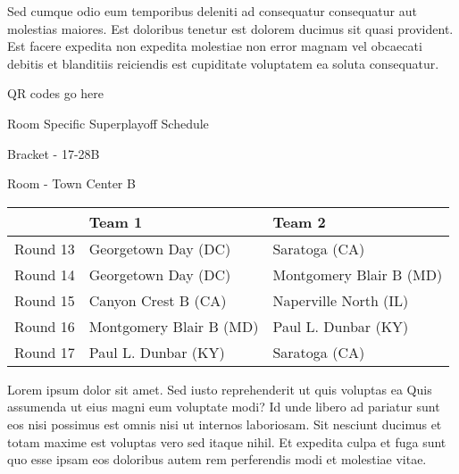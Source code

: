 \documentclass{article}%
\begin{document}
\newline%
Sed cumque odio eum temporibus deleniti ad consequatur consequatur aut molestias maiores. Est doloribus tenetur est dolorem ducimus sit quasi provident. Est facere expedita non expedita molestiae non error magnam vel obcaecati debitis et blanditiis reiciendis est cupiditate voluptatem ea soluta consequatur.%
\vspace*{140pt}%
\begin{center}%
\begin{Huge}%
QR codes go here%
\end{Huge}%
\end{center}%
\newpage%
\begin{center}%
\begin{Huge}%
Room Specific Superplayoff Schedule%
\end{Huge}%
\vspace*{8pt}%
\linebreak%
\begin{Large}%
Bracket {-} 17{-}28B%
\end{Large}%
\vspace*{8pt}%
\linebreak%
\vspace*{8pt}%
\begin{Large}%
Room {-} Town Center B%
\end{Large}%
\end{center}%
%
\begin{tabularx}{\textwidth}{|c|Y|Y|}%
\hline%
&Team 1&Team 2\\%
\hline%
Round 13&Georgetown Day (DC)&Saratoga (CA)\\%
Round 14&Georgetown Day (DC)&Montgomery Blair B (MD)\\%
Round 15&Canyon Crest B (CA)&Naperville North (IL)\\%
Round 16&Montgomery Blair B (MD)&Paul L. Dunbar (KY)\\%
Round 17&Paul L. Dunbar (KY)&Saratoga (CA)\\%
\hline%
\end{tabularx}%
\vspace*{8pt}%
\newline%
Lorem ipsum dolor sit amet. Sed iusto reprehenderit ut quis voluptas ea Quis assumenda ut eius magni eum voluptate modi? Id unde libero ad pariatur sunt eos nisi possimus est omnis nisi ut internos laboriosam. Sit nesciunt ducimus et totam maxime est voluptas vero sed itaque nihil. Et expedita culpa et fuga sunt quo esse ipsam eos doloribus autem rem perferendis modi et molestiae vitae.\newline%
\end{document}
